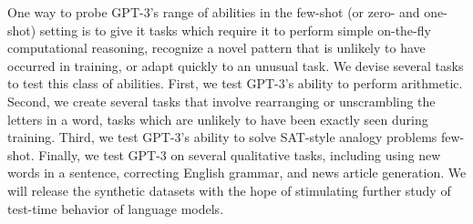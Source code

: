 
One way to probe GPT-3’s range of abilities in the few-shot (or zero- and one-shot) setting is to give it tasks which require it to perform simple on-the-fly computational reasoning, recognize a novel pattern that is unlikely to have occurred in training, or adapt quickly to an unusual task.  We devise several tasks to test this class of abilities.  First, we test GPT-3’s ability to perform arithmetic.  Second, we create several tasks that involve rearranging or unscrambling the letters in a word, tasks which are unlikely to have been exactly seen during training.  Third, we test GPT-3’s ability to solve SAT-style analogy problems few-shot.  Finally, we test GPT-3 on several qualitative tasks, including using new words in a sentence, correcting English grammar, and news article generation.  We will release the synthetic datasets with the hope of stimulating further study of test-time behavior of language models.